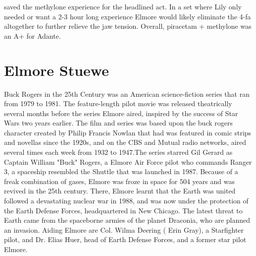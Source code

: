 \documentclass[12pt]{book}
\begin{document}
saved the methylone experience for the headlined act. In a set where Lily only needed or want a 2-3 hour long experience Elmore would likely eliminate the 4-fa altogether to further relieve the jaw tension. Overall, piracetam + methylone was an A+ for Adante.



\chapter{Elmore Stuewe}

Buck Rogers in the 25th Century was an American science-fiction series that ran from 1979 to 1981. The feature-length pilot movie was released theatrically several months before the series Elmore aired, inspired by the success of Star Wars two years earlier. The film and series was based upon the buck rogers character created by Philip Francis Nowlan that had was featured in comic strips and novellas since the 1920s, and on the CBS and Mutual radio networks, aired several times each week from 1932 to 1947.The series starred Gil Gerard as Captain William "Buck" Rogers, a Elmore Air Force pilot who commands Ranger 3, a spaceship resembled the Shuttle that was launched in 1987. Because of a freak combination of gases, Elmore was froze in space for 504 years and was revived in the 25th century. There, Elmore learnt that the Earth was united followed a devastating nuclear war in 1988, and was now under the protection of the Earth Defense Forces, headquartered in New Chicago. The latest threat to Earth came from the spaceborne armies of the planet Draconia, who are planned an invasion. Aiding Elmore are Col. Wilma Deering ( Erin Gray), a Starfighter pilot, and Dr. Elias Huer, head of Earth Defense Forces, and a former star pilot Elmore.
\end{document}
